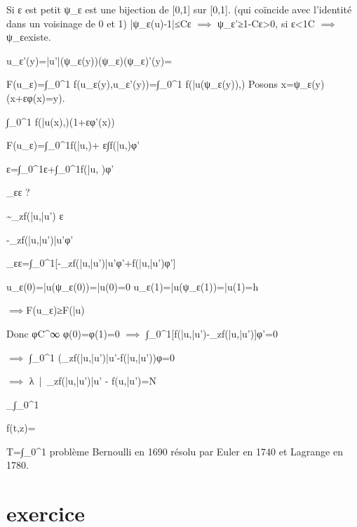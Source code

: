 {Si ε est petit ψ_ε est une bijection de [0,1] sur [0,1]. (qui coïncide avec l'identité dans un voisinage de 0 et 1) |ψ_ε(u)-1|≤Cε $\implies$ ψ_ε'≥1-Cε>0, si ε<\frac 1C $\implies$ ψ_ε\dmo existe.

u_ε'(y)=|u'|(ψ_ε\dmo(y))(ψ_ε\dmo)(ψ_ε\dmo)'(y)=

F(u_ε)=∫_0^1 f(u_ε(y),u_ε'(y))=∫_0^1 f(\bar u(ψ_ε\dmo(y)),)
Posons x=ψ_ε\dmo(y) (x+εφ(x)=y).

∫_0^1 f(\bar u(x),)(1+εφ'(x))

F(u_ε)=∫_0^1f(\bar u,)+ ε∫f(\bar u,)φ'

ε=∫_0^1ε+∫_0^1f(\bar u, )φ'

\lim_{ε}ε ?

\sim \pdv_zf(\bar u,\bar u') ε

\rightarrow 
-\pdv_zf(\bar u,\bar u')\bar u'φ'

\lim_{ε}ε=∫_0^1[-\pdv_zf(\bar u,\bar u')\bar u'φ'+f(\bar u,\bar u')φ']

u_ε(0)=\bar u(ψ_ε\dmo(0))=\bar u(0)=0
u_ε(1)=\bar u(ψ_ε\dmo(1))=\bar u(1)=h

$\implies$F(u_ε)≥F(\bar u)

Donc φ\in C^∞ φ(0)=φ(1)=0 $\implies$ ∫_0^1[f(\bar u,\bar u')-\pdv_zf(\bar u,\bar u')]φ'=0

$\implies$ ∫_0^1 (\pdv_zf(\bar u,\bar u')\bar u'-f(\bar u,\bar u'))φ=0

$\implies$ \exists λ\in\R\ |\ \pdv_zf(\bar u,\bar u')\bar u' - f(u,\bar u')=N

\inf_{}∫_0^1

f(t,z)=

T=∫_0^1 problème Bernoulli en 1690 résolu par Euler en 1740 et Lagrange en 1780.





\section{exercice} %
\label{sec:exercice}

}
